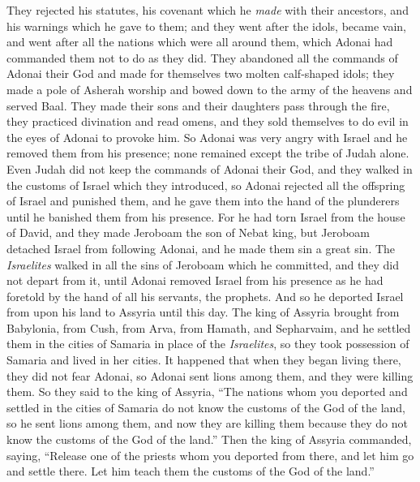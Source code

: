\begin{biblechapter}
\verse They rejected his statutes, his covenant which he \textit{made} with their ancestors, and his warnings which he gave to them; and they went after the idols, became vain, and went after all the nations which were all around them, which Adonai had commanded them not to do as they did.
\verse They abandoned all the commands of Adonai their God and made for themselves two molten calf-shaped idols; they made a pole of Asherah worship and bowed down to the army of the heavens and served Baal.
\verse They made their sons and their daughters pass through the fire, they practiced divination and read omens, and they sold themselves to do evil in the eyes of Adonai to provoke him.
\verse So Adonai was very angry with Israel and he removed them from his presence; none remained except the tribe of Judah alone.
\verse Even Judah did not keep the commands of Adonai their God, and they walked in the customs of Israel which they introduced,
\verse so Adonai rejected all the offspring of Israel and punished them, and he gave them into the hand of the plunderers until he banished them from his presence.
\verse For he had torn Israel from the house of David, and they made Jeroboam the son of Nebat king, but Jeroboam detached Israel from following Adonai, and he made them sin a great sin.
\verse The \textit{Israelites} walked in all the sins of Jeroboam which he committed, and they did not depart from it,
\verse until Adonai removed Israel from his presence as he had foretold by the hand of all his servants, the prophets. And so he deported Israel from upon his land to Assyria until this day.
 The king of Assyria brought from Babylonia, from Cush, from Arva, from Hamath, and Sepharvaim, and he settled them in the cities of Samaria in place of the \textit{Israelites}, so they took possession of Samaria and lived in her cities.
\verse It happened that when they began living there, they did not fear Adonai, so Adonai sent lions among them, and they were killing them.
\verse So they said to the king of Assyria, “The nations whom you deported and settled in the cities of Samaria do not know the customs of the God of the land, so he sent lions among them, and now they are killing them because they do not know the customs of the God of the land.”
\verse Then the king of Assyria commanded, saying, “Release one of the priests whom you deported from there, and let him go and settle there. Let him teach them the customs of the God of the land.”

\end{biblechapter}
